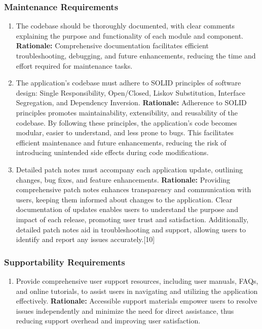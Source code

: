 \documentclass[]{article}
\begin{document}
\subsubsection{Maintenance Requirements}
\label{ssub:maintenance_requirements}
\begin{enumerate}[{MS-M}1. ]
	\item The codebase should be thoroughly documented, with clear comments explaining the purpose and functionality of each module and component. \newline
	      \textbf{Rationale:} Comprehensive documentation facilitates efficient troubleshooting, debugging, and future enhancements, reducing the time and effort required for maintenance tasks.
	\item The application's codebase must adhere to SOLID principles of software design: Single Responsibility, Open/Closed, Liskov Substitution, Interface Segregation, and Dependency Inversion. \newline
	      \textbf{Rationale:} Adherence to SOLID principles promotes maintainability, extensibility, and reusability of the codebase. By following these principles, the application's code becomes modular, easier to understand, and less prone to bugs. This facilitates efficient maintenance and future enhancements, reducing the risk of introducing unintended side effects during code modifications.
	\item Detailed patch notes must accompany each application update, outlining changes, bug fixes, and feature enhancements. \newline
	      \textbf{Rationale:} Providing comprehensive patch notes enhances transparency and communication with users, keeping them informed about changes to the application. Clear documentation of updates enables users to understand the purpose and impact of each release, promoting user trust and satisfaction. Additionally, detailed patch notes aid in troubleshooting and support, allowing users to identify and report any issues accurately.[10]
\end{enumerate}

\subsubsection{Supportability Requirements}
\label{ssub:supportability_requirements}
\begin{enumerate}[{MS-S}1. ]
	\item Provide comprehensive user support resources, including user manuals, FAQs, and online tutorials, to assist users in navigating and utilizing the application effectively. \newline
	      \textbf{Rationale:} Accessible support materials empower users to resolve issues independently and minimize the need for direct assistance, thus reducing support overhead and improving user satisfaction.
\end{enumerate}
\end{document}
